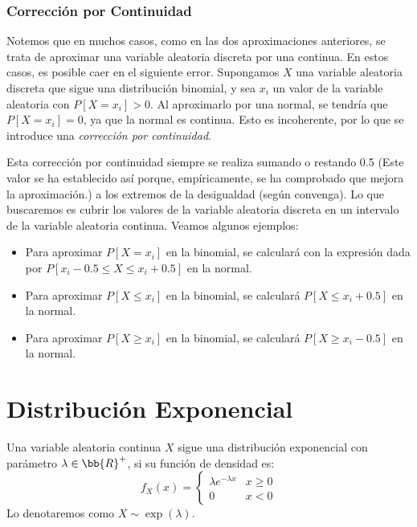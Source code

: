 \subsubsection{Corrección por Continuidad}

Notemos que en muchos casos, como en las dos aproximaciones anteriores, se trata de aproximar una variable aleatoria discreta por una continua.
En estos casos, es posible caer en el siguiente error.
Supongamos $X$ una variable aleatoria discreta que sigue una distribución binomial,
y sea $x_i$ un valor de la variable aleatoria con $P[X=x_i]>0$. Al aproximarlo por una normal, se tendría que $P[X=x_i] = 0$, ya que la normal es continua.
Esto es incoherente, por lo que se introduce una \emph{corrección por continuidad}.

Esta corrección por continuidad siempre se realiza sumando o restando 0.5 (Este valor se ha establecido así porque, empíricamente, se ha comprobado que mejora la aproximación.) a los extremos de la desigualdad (según convenga).
Lo que buscaremos es cubrir los valores de la variable aleatoria discreta en un intervalo de la variable aleatoria continua. Veamos algunos ejemplos:
\begin{itemize}
    \item Para aproximar $P[X= x_i]$ en la binomial, se calculará con la expresión dada por $P[x_i-0.5 \leq X\leq x_i+0.5]$ en la normal.
    \item Para aproximar $P[X\leq x_i]$ en la binomial, se calculará $P[X\leq x_i+0.5]$ en la normal.
    \item Para aproximar $P[X\geq x_i]$ en la binomial, se calculará $P[X\geq x_i-0.5]$ en la normal.
\end{itemize}


\section{Distribución Exponencial}

\begin{definicion}
    Una variable aleatoria continua $X$ sigue una distribución exponencial con parámetro $\lambda\in \bb{R}^+$, si su función de densidad es:
    \begin{equation*}
        f_X(x) = \begin{cases}
            \lambda e^{-\lambda x} & x\geq 0\\
            0 & x<0
        \end{cases}
    \end{equation*}
    Lo denotaremos como $X\sim \exp(\lambda)$.
\end{definicion}

